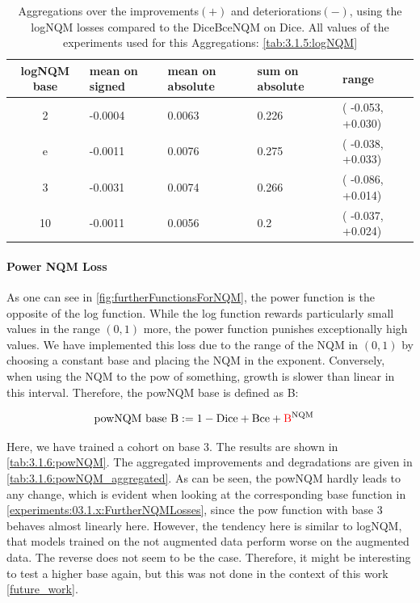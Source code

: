 \begin{table}[h!]
    \centering
    \begin{tabular}{|c|l|l|l|l|}
        \hline
        \bfseries logNQM base & mean on signed & mean on absolute & sum on absolute & range\\\hline
        2   & -0.0004 & 0.0063 & 0.226 & ( -0.053, +0.030)\\
        e   & -0.0011 & 0.0076 & 0.275 & ( -0.038, +0.033)\\
        3   & -0.0031 & 0.0074 & 0.266 & ( -0.086, +0.014)\\
        10  & -0.0011 & 0.0056 & 0.2   & ( -0.037, +0.024)\\\hline
    \end{tabular}
    \caption{Aggregations over the improvements$(+)$ and deteriorations$(-)$, using the logNQM losses compared to the DiceBceNQM on Dice. All values of the experiments used for this Aggregations: \autoref{tab:3.1.5:logNQM}}
    \label{tab:3.1.5:logNQM_aggregated}
\end{table}


\paragraph{Power NQM Loss}
\label{experiments:03.1.6:backbone_hippo:powNQM}
As one can see in \autoref{fig:furtherFunctionsForNQM}, the power function is the opposite of the log function. While the log function rewards particularly small values in the range $(0,1)$ more, the power function punishes exceptionally high values. We have implemented this loss due to the range of the NQM in $(0,1)$ by choosing a constant base and placing the NQM in the exponent. Conversely, when using the NQM to the pow of something, growth is slower than linear in this interval.
Therefore, the powNQM base is defined as B:

\begin{align}
    \text{powNQM base B} &:= 1 - \mathrm{Dice} + \mathrm{Bce} + {\color{red} \mathrm{B}}^\mathrm{NQM}
\end{align}

Here, we have trained a cohort on base 3. The results are shown in \autoref{tab:3.1.6:powNQM}. The aggregated improvements and degradations are given in \autoref{tab:3.1.6:powNQM_aggregated}. As can be seen, the powNQM hardly leads to any change, which is evident when looking at the corresponding base function in \autoref{experiments:03.1.x:FurtherNQMLosses}, since the pow function with base 3 behaves almost linearly here. However, the tendency here is similar to logNQM, that models trained on the not augmented data perform worse on the augmented data. The reverse does not seem to be the case.
Therefore, it might be interesting to test a higher base again, but this was not done in the context of this work \autoref{future_work}.

